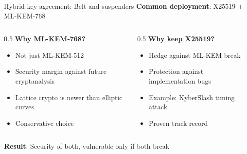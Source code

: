 \documentclass[aspectratio=169, lualatex]{beamer} %
\begin{document}
\begin{frame}{Hybrid key agreement: Belt and suspenders}
	\textbf{Common deployment}: X25519 + ML-KEM-768
	\vspace{3mm}
	\begin{columns}[c]
		\begin{column}{0.5\textwidth}
			\textbf{Why ML-KEM-768?}
			\begin{itemize}
				\item Not just ML-KEM-512
				\item Security margin against future cryptanalysis
				\item Lattice crypto is newer than elliptic curves
				\item Conservative choice
			\end{itemize}
		\end{column}
		\begin{column}{0.5\textwidth}
			\textbf{Why keep X25519?}
			\begin{itemize}
				\item Hedge against ML-KEM break
				\item Protection against implementation bugs
				\item Example: KyberSlash timing attack
				\item Proven track record
			\end{itemize}
		\end{column}
	\end{columns}
	\vspace{5mm}
	\begin{center}
		\textbf{Result}: Security of both, vulnerable only if both break
	\end{center}
\end{frame}
\end{document}
